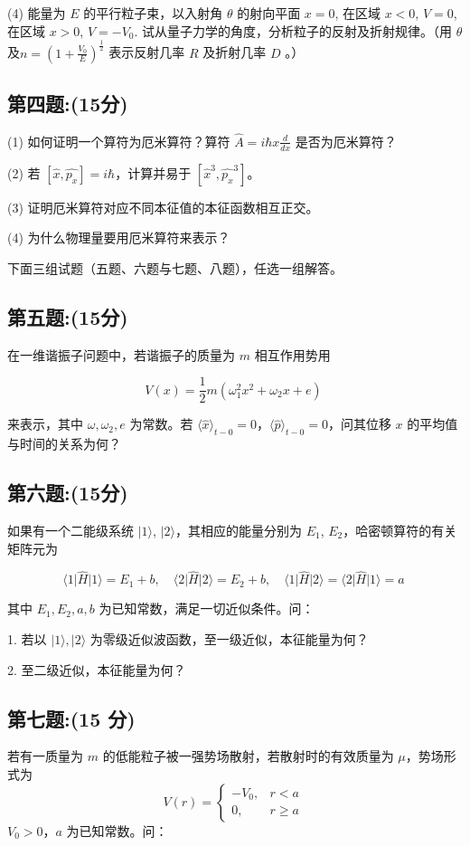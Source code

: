 (4) 
能量为 $E$ 的平行粒子束，以入射角 $\theta$ 的射向平面 $x = 0$, 在区域 $x < 0$, $V = 0$, 在区域 $x > 0$, $V = -V_0$. 试从量子力学的角度，分析粒子的反射及折射规律。（用 $\theta$ 及$n = \left( 1 + \frac{V_0}{E} \right)^{\frac{1}{2}}$
表示反射几率 $R$ 及折射几率 $D$ 。）
\subsection{第四题:(15分)}
(1) 如何证明一个算符为厄米算符？算符 $\hat{A} = i \hbar x \frac{d}{dx}$ 是否为厄米算符？

(2) 若 $[\hat{x}, \hat{p_x}] = i\hbar$，计算并易于 $[\hat{x}^3, \hat{p_x}^3]$。

(3) 证明厄米算符对应不同本征值的本征函数相互正交。

(4) 为什么物理量要用厄米算符来表示？

下面三组试题（五题、六题与七题、八题），任选一组解答。
\subsection{第五题:(15分)}
在一维谐振子问题中，若谐振子的质量为 \(m\) 相互作用势用 

\[
V(x) = \frac{1}{2} m(\omega_1^2 x^2 + \omega_2 x + e)~
\]

来表示，其中 \(\omega, \omega_2, e\) 为常数。若 \(\langle \hat{x} \rangle_{t-0} = 0\)，\(\langle \hat{p} \rangle_{t-0} = 0\)，问其位移 \(x\) 的平均值与时间的关系为何？
\subsection{第六题:(15分)}
如果有一个二能级系统 \(\lvert 1 \rangle\), \(\lvert 2 \rangle\)，其相应的能量分别为 \(E_1\), \(E_2\)，哈密顿算符的有关矩阵元为

\[
\langle 1 \lvert \hat{H} \rvert 1 \rangle = E_1 + b, \quad \langle 2 \lvert \hat{H} \rvert 2 \rangle = E_2 + b, \quad \langle 1 \lvert \hat{H} \rvert 2 \rangle = \langle 2 \lvert \hat{H} \rvert 1 \rangle = a~
\]

其中 \(E_1, E_2, a, b\) 为已知常数，满足一切近似条件。问：

1. 若以 \(\lvert 1 \rangle, \lvert 2 \rangle\) 为零级近似波函数，至一级近似，本征能量为何？

2. 至二级近似，本征能量为何？
\subsection{第七题:(15 分)}
若有一质量为 $m$ 的低能粒子被一强势场散射，若散射时的有效质量为 $\mu$，势场形式为
$$
V(r) =
\begin{cases}
-V_0, & r < a \\
0, & r \geq a
\end{cases}~
$$
$V_0 > 0$，$a$ 为已知常数。问：

